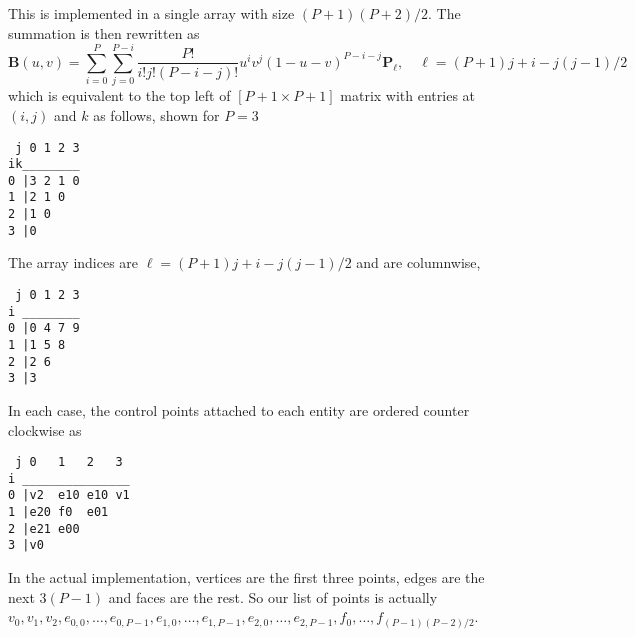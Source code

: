 \documentclass{article}
\begin{document}
This is implemented in a single array with size $(P+1)(P+2)/2$. The summation is then rewritten as
\[
\mathbf{B}(u,v) = \displaystyle\sum_{i=0}^P \sum_{j=0}^{P-i}\frac{P!}{i!j!(P-i-j)!}u^iv^j(1-u-v)^{P-i-j}\mathbf{P}_\ell, \quad \ell = (P+1)j+i-j(j-1)/2
\]
which is equivalent to the top left of $[P+1\times P+1]$ matrix with entries at $(i,j)$ and $k$ as follows, shown for $P = 3$
\begin{verbatim}
 j 0 1 2 3
ik________
0 |3 2 1 0
1 |2 1 0   
2 |1 0 
3 |0 
\end{verbatim}
The array indices are $\ell = (P+1)j+i-j(j-1)/2$ and are columnwise,
\begin{verbatim}
 j 0 1 2 3
i ________ 
0 |0 4 7 9
1 |1 5 8   
2 |2 6 
3 |3 
\end{verbatim}
In each case, the control points attached to each entity are ordered counter clockwise as
\begin{verbatim}
 j 0   1   2   3
i _______________ 
0 |v2  e10 e10 v1
1 |e20 f0  e01   
2 |e21 e00 
3 |v0 
\end{verbatim}
In the actual implementation, vertices are the first three points, edges are the next $3(P-1)$ and faces are the rest. So our list of points is actually $v_0,v_1,v_2,e_{0,0},\ldots,e_{0,P-1},e_{1,0},\ldots,e_{1,P-1},e_{2,0},\ldots,e_{2,P-1},f_0,\ldots,f_{(P-1)(P-2)/2}$. 
\end{document}
